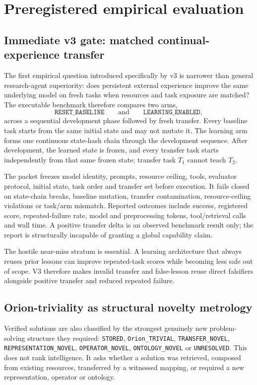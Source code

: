 \section{Preregistered empirical evaluation}


\subsection{Immediate v3 gate: matched continual-experience transfer}
The first empirical question introduced specifically by v3 is narrower than general research-agent superiority: does persistent external experience improve the same underlying model on fresh tasks when resources and task exposure are matched? The executable benchmark therefore compares two arms,
\[
\texttt{RESET\_BASELINE}
\qquad\text{and}\qquad
\texttt{LEARNING\_ENABLED},
\]
across a sequential development phase followed by fresh transfer. Every baseline task starts from the same initial state and may not mutate it. The learning arm forms one continuous state-hash chain through the development sequence. After development, the learned state is frozen, and every transfer task starts independently from that same frozen state; transfer task $T_1$ cannot teach $T_2$.

The packet freezes model identity, prompts, resource ceiling, tools, evaluator protocol, initial state, task order and transfer set before execution. It fails closed on state-chain breaks, baseline mutation, transfer contamination, resource-ceiling violations or task/arm mismatch. Reported outcomes include success, registered score, repeated-failure rate, model and preprocessing tokens, tool/retrieval calls and wall time. A positive transfer delta is an observed benchmark result only; the report is structurally incapable of granting a global capability claim.

The hostile near-miss stratum is essential. A learning architecture that always reuses prior lessons can improve repeated-task scores while becoming less safe out of scope. V3 therefore makes invalid transfer and false-lesson reuse direct falsifiers alongside positive transfer and reduced repeated failure.

\subsection{Orion-triviality as structural novelty metrology}
Verified solutions are also classified by the strongest genuinely new problem-solving structure they required: \texttt{STORED}, \texttt{Orion\_TRIVIAL}, \texttt{TRANSFER\_NOVEL}, \texttt{REPRESENTATION\_NOVEL}, \texttt{OPERATOR\_NOVEL}, \texttt{ONTOLOGY\_NOVEL} or \texttt{UNRESOLVED}. This does not rank intelligence. It asks whether a solution was retrieved, composed from existing resources, transferred by a witnessed mapping, or required a new representation, operator or ontology.

